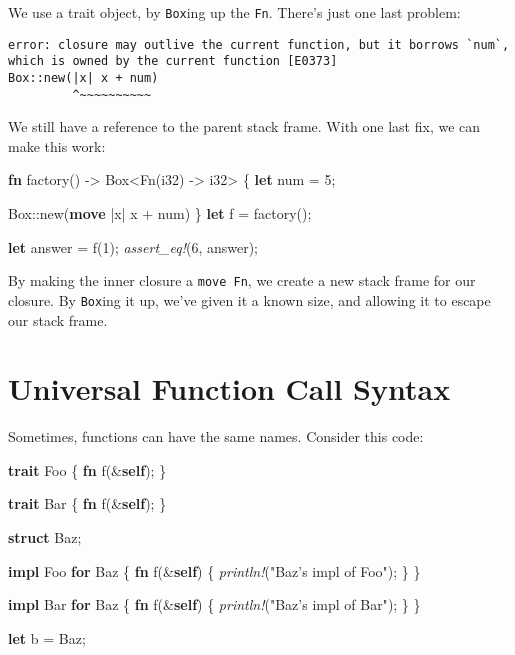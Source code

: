 \documentclass[a4paper,]{book}
\newenvironment{Shaded}{\begin{snugshade}}{\end{snugshade}}
\newcommand{\KeywordTok}[1]{\textcolor[rgb]{0.13,0.29,0.53}{\textbf{{#1}}}}
\newcommand{\DataTypeTok}[1]{\textcolor[rgb]{0.13,0.29,0.53}{{#1}}}
\newcommand{\DecValTok}[1]{\textcolor[rgb]{0.00,0.00,0.81}{{#1}}}
\newcommand{\StringTok}[1]{\textcolor[rgb]{0.31,0.60,0.02}{{#1}}}
\newcommand{\BuiltInTok}[1]{{#1}}
\newcommand{\PreprocessorTok}[1]{\textcolor[rgb]{0.56,0.35,0.01}{\textit{{#1}}}}
\newcommand{\NormalTok}[1]{{#1}}
\begin{document}
We use a trait object, by \texttt{Box}ing up the \texttt{Fn}. There's
just one last problem:

\begin{verbatim}
error: closure may outlive the current function, but it borrows `num`,
which is owned by the current function [E0373]
Box::new(|x| x + num)
         ^~~~~~~~~~~
\end{verbatim}

We still have a reference to the parent stack frame. With one last fix,
we can make this work:

\begin{Shaded}
\begin{Highlighting}[]
\KeywordTok{fn} \NormalTok{factory() -> }\DataTypeTok{Box}\NormalTok{<}\BuiltInTok{Fn}\NormalTok{(}\DataTypeTok{i32}\NormalTok{) -> }\DataTypeTok{i32}\NormalTok{> \{}
    \KeywordTok{let} \NormalTok{num = }\DecValTok{5}\NormalTok{;}

    \DataTypeTok{Box}\NormalTok{::new(}\KeywordTok{move} \NormalTok{|x| x + num)}
\NormalTok{\}}
\KeywordTok{let} \NormalTok{f = factory();}

\KeywordTok{let} \NormalTok{answer = f(}\DecValTok{1}\NormalTok{);}
\PreprocessorTok{assert_eq!}\NormalTok{(}\DecValTok{6}\NormalTok{, answer);}
\end{Highlighting}
\end{Shaded}

By making the inner closure a \texttt{move\ Fn}, we create a new stack
frame for our closure. By \texttt{Box}ing it up, we've given it a known
size, and allowing it to escape our stack frame.

\section{Universal Function Call Syntax}\label{sec--ufcs}

Sometimes, functions can have the same names. Consider this code:

\begin{Shaded}
\begin{Highlighting}[]
\KeywordTok{trait} \NormalTok{Foo \{}
    \KeywordTok{fn} \NormalTok{f(&}\KeywordTok{self}\NormalTok{);}
\NormalTok{\}}

\KeywordTok{trait} \NormalTok{Bar \{}
    \KeywordTok{fn} \NormalTok{f(&}\KeywordTok{self}\NormalTok{);}
\NormalTok{\}}

\KeywordTok{struct} \NormalTok{Baz;}

\KeywordTok{impl} \NormalTok{Foo }\KeywordTok{for} \NormalTok{Baz \{}
    \KeywordTok{fn} \NormalTok{f(&}\KeywordTok{self}\NormalTok{) \{ }\PreprocessorTok{println!}\NormalTok{(}\StringTok{"Baz’s impl of Foo"}\NormalTok{); \}}
\NormalTok{\}}

\KeywordTok{impl} \NormalTok{Bar }\KeywordTok{for} \NormalTok{Baz \{}
    \KeywordTok{fn} \NormalTok{f(&}\KeywordTok{self}\NormalTok{) \{ }\PreprocessorTok{println!}\NormalTok{(}\StringTok{"Baz’s impl of Bar"}\NormalTok{); \}}
\NormalTok{\}}

\KeywordTok{let} \NormalTok{b = Baz;}
\end{Highlighting}
\end{Shaded}
\end{document}
